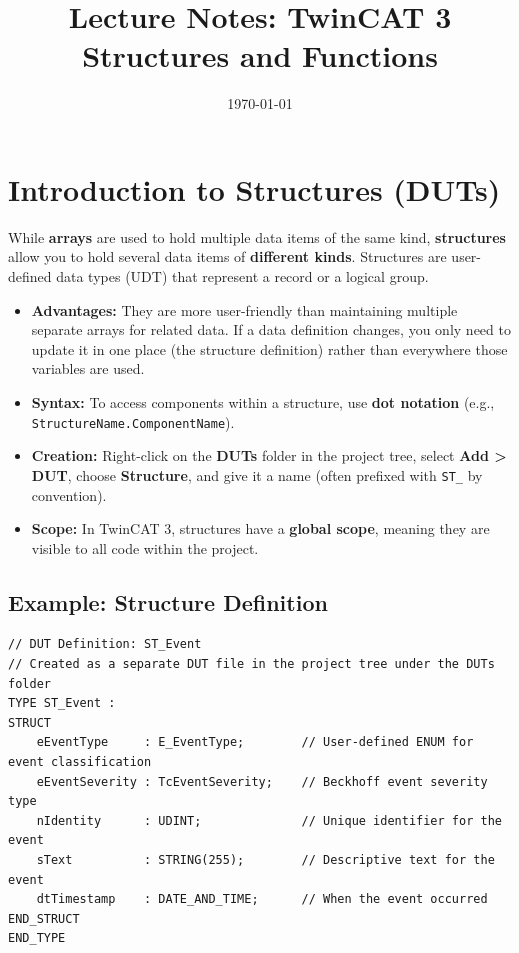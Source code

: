 \documentclass[11pt,a4paper]{article}
\title{
    \vspace{-1cm}
    \textbf{Lecture Notes: TwinCAT 3}\\
    \Large Structures and Functions
}
\author{}
\date{\today}
\begin{document}
\maketitle

\tableofcontents
\newpage

\section{Introduction to Structures (DUTs)}

While \textbf{arrays} are used to hold multiple data items of the same kind, \textbf{structures} allow you to hold several data items of \textbf{different kinds}. Structures are user-defined data types (UDT) that represent a record or a logical group.

\begin{itemize}[leftmargin=*]
    \item \textbf{Advantages:} They are more user-friendly than maintaining multiple separate arrays for related data. If a data definition changes, you only need to update it in one place (the structure definition) rather than everywhere those variables are used.
    
    \item \textbf{Syntax:} To access components within a structure, use \textbf{dot notation} (e.g., \texttt{StructureName.ComponentName}).
    
    \item \textbf{Creation:} Right-click on the \textbf{DUTs} folder in the project tree, select \textbf{Add > DUT}, choose \textbf{Structure}, and give it a name (often prefixed with \texttt{ST\_} by convention).
    
    \item \textbf{Scope:} In TwinCAT 3, structures have a \textbf{global scope}, meaning they are visible to all code within the project.
\end{itemize}

\subsection*{Example: Structure Definition}

\begin{lstlisting}
// DUT Definition: ST_Event
// Created as a separate DUT file in the project tree under the DUTs folder
TYPE ST_Event :
STRUCT
    eEventType     : E_EventType;        // User-defined ENUM for event classification
    eEventSeverity : TcEventSeverity;    // Beckhoff event severity type
    nIdentity      : UDINT;              // Unique identifier for the event
    sText          : STRING(255);        // Descriptive text for the event
    dtTimestamp    : DATE_AND_TIME;      // When the event occurred
END_STRUCT
END_TYPE
\end{lstlisting}
\end{document}
